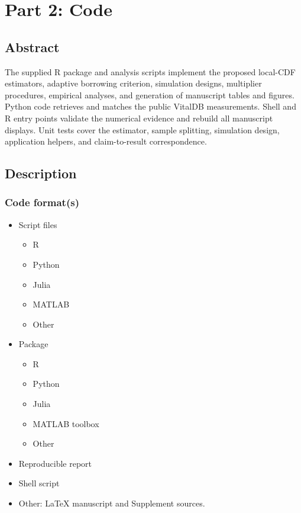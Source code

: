 \documentclass[
  10pt,
]{article}
\providecommand{\tightlist}{%
  \setlength{\itemsep}{0pt}\setlength{\parskip}{0pt}}
\begin{document}
\section{Part 2: Code}\label{part-2-code}

\subsection{Abstract}\label{abstract-1}

The supplied R package and analysis scripts implement the proposed
local-CDF estimators, adaptive borrowing criterion, simulation designs,
multiplier procedures, empirical analyses, and generation of manuscript
tables and figures. Python code retrieves and matches the public VitalDB
measurements. Shell and R entry points validate the numerical evidence
and rebuild all manuscript displays. Unit tests cover the estimator,
sample splitting, simulation design, application helpers, and
claim-to-result correspondence.

\subsection{Description}\label{description-1}

\subsubsection{Code format(s)}\label{code-formats}

\begin{itemize}
\tightlist
\item[$\boxtimes$]
  Script files

  \begin{itemize}
  \tightlist
  \item[$\boxtimes$]
    R
  \item[$\boxtimes$]
    Python
  \item[$\square$]
    Julia
  \item[$\square$]
    MATLAB
  \item[$\square$]
    Other
  \end{itemize}
\item[$\boxtimes$]
  Package

  \begin{itemize}
  \tightlist
  \item[$\boxtimes$]
    R
  \item[$\square$]
    Python
  \item[$\square$]
    Julia
  \item[$\square$]
    MATLAB toolbox
  \item[$\square$]
    Other
  \end{itemize}
\item[$\square$]
  Reproducible report
\item[$\boxtimes$]
  Shell script
\item[$\boxtimes$]
  Other: LaTeX manuscript and Supplement sources.
\end{itemize}
\end{document}
